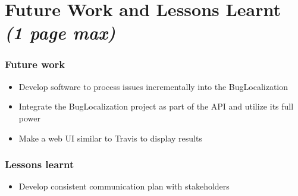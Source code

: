 \documentclass[12pt]{article}
\providecommand{\tightlist}{%
  \setlength{\itemsep}{0pt}\setlength{\parskip}{0pt}}
\begin{document}
\hypertarget{future-work-and-lessons-learnt-1-page-max}{%
\section{\texorpdfstring{Future Work and Lessons Learnt \emph{(1 page
max)}}{Future Work and Lessons Learnt (1 page max)}}\label{future-work-and-lessons-learnt-1-page-max}}

\hypertarget{future-work}{%
\subsubsection{Future work}\label{future-work}}

\begin{itemize}
\tightlist
\item
  Develop software to process issues incrementally into the
  BugLocalization
\item
  Integrate the BugLocalization project as part of the API and utilize
  its full power
\item
  Make a web UI similar to Travis to display results
\end{itemize}

\hypertarget{lessons-learnt}{%
\subsubsection{Lessons learnt}\label{lessons-learnt}}

\begin{itemize}
\tightlist
\item
  Develop consistent communication plan with stakeholders
\end{itemize}



\end{document}

